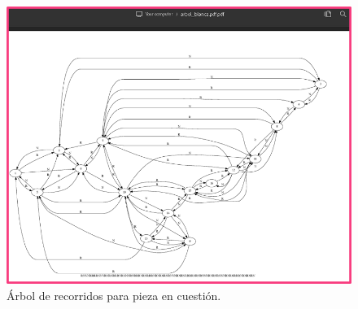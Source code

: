 \begin{enumerate}
\begin{figure}[h]
\begin{minipage}{0.3\textwidth}
    \includegraphics[width=4\linewidth]{Images/Cap16.png}
\end{minipage}
\caption{Árbol de recorridos para pieza en cuestión.}
\label{fig:imagen}
\end{figure}

\end{enumerate}